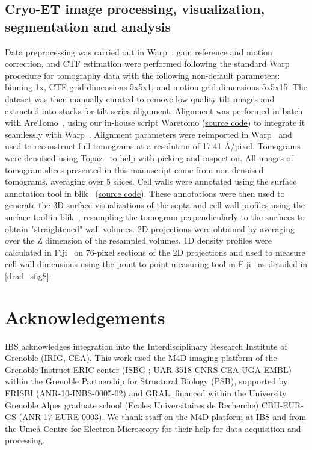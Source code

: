 \subsection{Cryo-ET image processing, visualization, segmentation and analysis}
Data preprocessing was carried out in Warp~\cite{tegunovRealtimeCryoelectronMicroscopy2019}: gain reference and motion correction, and CTF estimation were performed following the standard Warp~\cite{tegunovRealtimeCryoelectronMicroscopy2019} procedure for tomography data with the following non-default parameters: binning 1x, CTF grid dimensions 5x5x1, and motion grid dimensions 5x5x15.
The dataset was then manually curated to remove low quality tilt images and extracted into stacks for tilt series alignment.
Alignment was performed in batch with AreTomo~\cite{zhengAreTomoIntegratedSoftware2022}, using our in-house script Waretomo (\href{https://doi.org/10.5281/zenodo.13350542}{source code}) to integrate it seamlessly with Warp~\cite{tegunovRealtimeCryoelectronMicroscopy2019}.
Alignment parameters were reimported in Warp~\cite{tegunovRealtimeCryoelectronMicroscopy2019} and used to reconstruct full tomograms at a resolution of 17.41 Å/pixel.
Tomograms were denoised using Topaz~\cite{beplerTopazDenoiseGeneralDeep2020} to help with picking and inspection.
All images of tomogram slices presented in this manuscript come from non-denoised tomograms, averaging over 5 slices.
Cell walls were annotated using the surface annotation tool in blik~\cite{gaifasBlikExtensible3D2024} (\href{https://zenodo.org/records/10894490}{source code}).
These annotations were then used to generate the 3D surface visualizations of the septa and cell wall profiles using the surface tool in blik~\cite{gaifasBlikExtensible3D2024}, resampling the tomogram perpendicularly to the surfaces to obtain "straightened" wall volumes.
2D projections were obtained by averaging over the Z dimension of the resampled volumes.
1D density profiles were calculated in Fiji~\cite{schindelinFijiOpensourcePlatform2012} on 76-pixel sections of the 2D projections and used to measure cell wall dimensions using the point to point measuring tool in Fiji~\cite{schindelinFijiOpensourcePlatform2012} as detailed in \autoref{drad_sfig8}.

\section{Acknowledgements}
IBS acknowledges integration into the Interdisciplinary Research Institute of Grenoble (IRIG, CEA).
This work used the M4D imaging platform of the Grenoble Instruct-ERIC center (ISBG ; UAR 3518 CNRS-CEA-UGA-EMBL) within the Grenoble Partnership for Structural Biology (PSB), supported by FRISBI (ANR-10-INBS-0005-02) and GRAL, financed within the University Grenoble Alpes graduate school (Ecoles Universitaires de Recherche) CBH-EUR-GS (ANR-17-EURE-0003).
We thank staff on the M4D platform at IBS and from the Umeå Centre for Electron Microscopy for their help for data acquisition and processing.

